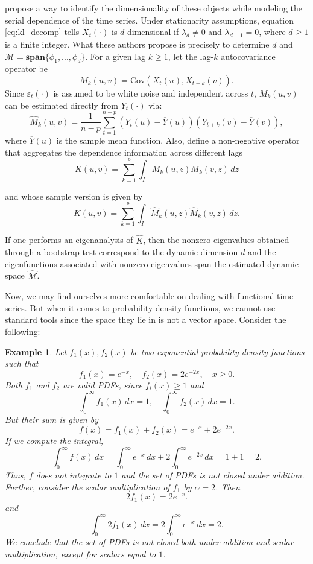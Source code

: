 \documentclass[
	12pt,				%
	oneside,			%
	a4paper,			%
	english,			%
	brazil				%
	]{abntex2ppgsi}
\newtheorem{example}{Example}
\begin{document}
 propose a way to identify the dimensionality of these objects while modeling the serial dependence of the time series. Under stationarity assumptions, equation \ref{eq:kl_decomp} tells $X_t(\cdot)$ is $d$-dimensional if $\lambda_d \neq 0$ and $\lambda_{d+1} = 0$, where $d \geq 1$ is a finite integer. What these authors propose is precisely to determine $d$ and $\mathcal{M}=\textbf{span}\{\phi_1,...,\phi_d\}$. For a given lag $k \geq 1$, let the lag-$k$ autocovariance operator be
\begin{equation}
M_k(u, v) = \text{Cov}(X_t(u), X_{t+k}(v)).
\label{eq:covariance_operator}
\end{equation}
Since $\varepsilon_t(\cdot)$ is assumed to be white noise and independent across $t$, $M_k(u,v)$ can be estimated directly from $Y_t(\cdot)$ via:
\[
\widehat{M}_k(u, v) = \frac{1}{n-p} \sum_{t=1}^{n-p} \left( Y_t(u) - \overline{Y}(u) \right)\left( Y_{t+k}(v) - \overline{Y}(v) \right),
\]
where $\overline{Y}(u)$ is the sample mean function. Also, define a non-negative operator that aggregates the dependence information across different lags
\begin{equation}
K(u, v) = \sum_{k=1}^{p} \int_I M_k(u, z) M_k(v, z) \, dz
\end{equation}

and whose sample version is given by
\begin{equation}
\widehat{K}(u,v) = \sum_{k=1}^{p} \int_I \widehat{M}_k(u, z) \widehat{M}_k(v, z) \, dz.
\end{equation}

If one performs an eigenanalysis of $\widehat{K}$, then the nonzero eigenvalues obtained through a bootstrap test correspond to the dynamic dimension $d$ and the eigenfunctions associated with nonzero eigenvalues span the estimated dynamic space $\widehat{\mathcal{M}}$.

Now, we may find ourselves more comfortable on dealing with functional time series. But when it comes to probability density functions, we cannot use standard tools since the space they lie in is not a vector space. Consider the following:

\begin{example} Let $f_1(x), f_2(x)$ be two exponential probability density functions such that 
\[
f_1(x) = e^{-x}, \quad f_2(x) = 2e^{-2x}, \quad x \geq 0.
\]
Both $f_1$ and $f_2$ are valid PDFs, since $f_i(x) \geq 1$ and
\[
\int_0^\infty f_1(x) \, dx = 1, \quad \int_0^\infty f_2(x) \, dx = 1.
\]
But their sum is given by
\[
f(x) = f_1(x) + f_2(x) = e^{-x} + 2e^{-2x}.
\]
If we compute the integral,
\[
\int_0^\infty f(x) \, dx = \int_0^\infty e^{-x} \, dx + 2 \int_0^\infty e^{-2x} \, dx = 1 + 1 = 2.
\]
Thus, $f$ does not integrate to $1$ and the set of PDFs is not closed under addition. Further, consider the scalar multiplication of $f_1$ by $\alpha=2$. Then
\[
2 f_1(x) = 2 e^{-x}.
\]
and
\[
\int_0^\infty 2f_1(x) \, dx = 2 \int_0^\infty e^{-x} \, dx = 2.
\]
We conclude that the set of PDFs is not closed both under addition and scalar multiplication, except for scalars equal to $1$. 
\end{example}
\end{document}
